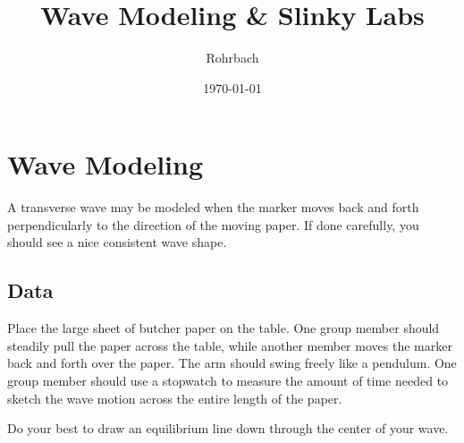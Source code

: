 \documentclass[10pt]{exam}
\title{Wave Modeling \& Slinky Labs}
\author{Rohrbach}
\date{\today}
\begin{document}
\maketitle

\vspace{-1em}


\section{Wave Modeling}

A transverse wave may be modeled when the marker moves back and forth perpendicularly to the direction of the moving paper.  If done carefully, you should see a nice consistent wave shape.

\subsection{Data}

Place the large sheet of butcher paper on the table.  One group member should steadily pull the paper across the table, while another member moves the marker back and forth over the paper.  The arm should swing freely like a pendulum.  One group member should use a stopwatch to measure the amount of time needed to sketch the wave motion across the entire length of the paper.

\vspace{1em}

\noindent
Do your best to draw an equilibrium line down through the center of your wave.

\vspace{2em}

\renewcommand{\arraystretch}{1.5}
\end{document}
